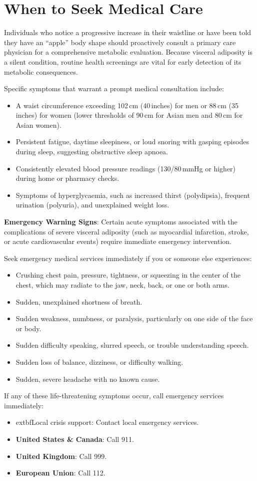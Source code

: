 \section*{When to Seek Medical Care}
Individuals who notice a progressive increase in their waistline or have been told they have an ``apple'' body shape should proactively consult a primary care physician for a comprehensive metabolic evaluation. Because visceral adiposity is a silent condition, routine health screenings are vital for early detection of its metabolic consequences.

Specific symptoms that warrant a prompt medical consultation include:
\begin{itemize}
    \item A waist circumference exceeding 102\,cm (40\,inches) for men or 88\,cm (35\,inches) for women (lower thresholds of 90\,cm for Asian men and 80\,cm for Asian women).
    \item Persistent fatigue, daytime sleepiness, or loud snoring with gasping episodes during sleep, suggesting obstructive sleep apnoea.
    \item Consistently elevated blood pressure readings (130/80\,mmHg or higher) during home or pharmacy checks.
    \item Symptoms of hyperglycaemia, such as increased thirst (polydipsia), frequent urination (polyuria), and unexplained weight loss.
\end{itemize}

\textbf{Emergency Warning Signs}: Certain acute symptoms associated with the complications of severe visceral adiposity (such as myocardial infarction, stroke, or acute cardiovascular events) require immediate emergency intervention.

Seek emergency medical services immediately if you or someone else experiences:
\begin{itemize}
    \item Crushing chest pain, pressure, tightness, or squeezing in the center of the chest, which may radiate to the jaw, neck, back, or one or both arms.
    \item Sudden, unexplained shortness of breath.
    \item Sudden weakness, numbness, or paralysis, particularly on one side of the face or body.
    \item Sudden difficulty speaking, slurred speech, or trouble understanding speech.
    \item Sudden loss of balance, dizziness, or difficulty walking.
    \item Sudden, severe headache with no known cause.
\end{itemize}
If any of these life-threatening symptoms occur, call emergency services immediately:
\begin{itemize}
    \item 	extbf{Local crisis support}: Contact local emergency services.
    \item \textbf{United States \& Canada}: Call 911.
    \item \textbf{United Kingdom}: Call 999.
    \item \textbf{European Union}: Call 112.
\end{itemize}

